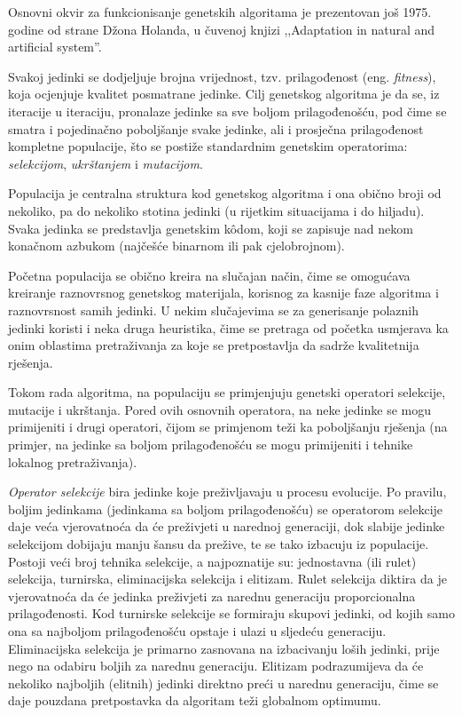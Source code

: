 \documentclass[a4paper, utf8, 11pt, colorlinks]{book}
\theoremstyle{definition}
\begin{document}
Osnovni okvir za funkcionisanje genetskih algoritama je prezentovan još 1975. godine od strane Džona Holanda, u čuvenoj knjizi ,,Adaptation in natural and artificial system''.

Svakoj jedinki se dodjeljuje brojna vrijednost, tzv. prilagođenost (eng.  \emph{fitness}), koja ocjenjuje kvalitet posmatrane jedinke. Cilj genetskog algoritma je da se, iz iteracije u iteraciju, pronalaze jedinke sa sve boljom prilagođenošću, pod čime se smatra i pojedinačno poboljšanje svake jedinke, ali i prosječna prilagođenost kompletne populacije, što se postiže standardnim genetskim operatorima: \textit{selekcijom}, \textit{ukrštanjem} i \textit{mutacijom}.

Populacija je centralna struktura kod genetskog algoritma i ona  obično broji od nekoliko, pa do nekoliko stotina jedinki (u rijetkim situacijama i do hiljadu). Svaka jedinka se predstavlja genetskim k\^odom, koji se zapisuje nad nekom konačnom azbukom (najčešće binarnom ili pak cjelobrojnom).


Početna populacija se obično kreira na slučajan način, čime se omogućava kreiranje raznovrsnog genetskog materijala, korisnog za kasnije faze algoritma i raznovrsnost samih jedinki. U nekim slučajevima se za generisanje polaznih jedinki koristi i neka druga heuristika, čime se pretraga od početka usmjerava ka onim oblastima pretraživanja za koje se pretpostavlja da sadrže kvalitetnija rješenja.

Tokom rada algoritma, na populaciju se primjenjuju genetski operatori selekcije, mutacije i ukrštanja. Pored ovih osnovnih operatora, na neke jedinke se mogu primijeniti i drugi operatori, čijom se primjenom teži ka poboljšanju rješenja (na primjer, na jedinke sa boljom prilagođenošću se mogu primijeniti i tehnike lokalnog  pretraživanja).

\emph{Operator selekcije} bira jedinke koje preživljavaju u procesu evolucije. Po pravilu, boljim jedinkama (jedinkama sa boljom prilagođenošću) se operatorom selekcije daje veća vjerovatnoća da će preživjeti u narednoj generaciji, dok  slabije jedinke selekcijom dobijaju manju šansu da prežive, te se tako izbacuju iz populacije. Postoji veći broj tehnika selekcije, a najpoznatije su: jednostavna (ili rulet) selekcija, turnirska, eliminacijska selekcija i elitizam. Rulet selekcija diktira da je vjerovatnoća da će jedinka preživjeti za narednu generaciju proporcionalna prilagođenosti. Kod turnirske selekcije se formiraju skupovi jedinki, od kojih samo ona sa najboljom prilagođenošću opstaje i ulazi u sljedeću generaciju. Eliminacijska selekcija je primarno zasnovana na izbacivanju loših jedinki, prije nego na odabiru boljih za narednu generaciju. Elitizam podrazumijeva da će nekoliko najboljih (elitnih) jedinki direktno preći u narednu generaciju, čime se daje pouzdana pretpostavka da  algoritam teži globalnom optimumu.
\end{document}
